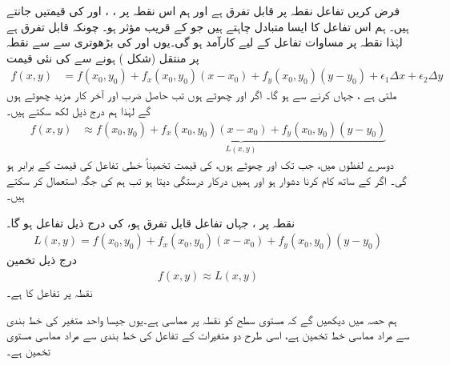 فرض کریں   تفاعل  نقطہ  پر  قابل تفرق ہے  اور ہم اس نقطہ پر     ،  ، اور  کی  قیمتیں  جانتے ہیں۔ ہم  اس تفاعل کا ایسا متبادل  چاہتے ہیں جو      کے قریب  مؤثر ہو۔ چونکہ  قابل تفرق ہے لہٰذا نقطہ  پر مساوات   تفاعل  کے لیے کارآمد ہو گی۔یوں  اور  کی بڑھوتری  سے    سے نقطہ   پر   منتقل  (شکل )    ہونے سے  کی نئی قیمت
\begin{align*}
f(x,y)&=f(x_0,y_0)+f_x(x_0,y_0)(x-x_0)+f_y(x_0,y_0)(y-y_0)+\epsilon_1\Delta x+\epsilon_2\Delta y
\end{align*}
ملتی ہے ، جہاں  کرنے سے  ہو گا۔ اگر  اور  چھوٹے ہوں تب حاصل ضرب   اور    آخر کار  مزید چھوٹے ہوں گے لہٰذا ہم درج ذیل لکھ سکتے ہیں۔
\begin{align*}
f(x,y)&\approx \underbrace{f(x_0,y_0)+f_x(x_0,y_0)(x-x_0)+f_y(x_0,y_0)(y-y_0)}_{L(x,y)}
\end{align*}
دوسرے لفظوں میں، جب تک  اور  چھوٹے ہوں،  کی قیمت تخمیناً خطی تفاعل  کی   قیمت کے برابر ہو گی۔ اگر  کے ساتھ کام کرنا دشوار ہو اور  ہمیں درکار درستگی دیتا ہو تب ہم  کی جگہ  استعمال کر سکتے ہیں۔

نقطہ پر  ،  جہاں تفاعل  قابل تفرق ہو،  کی  درج ذیل تفاعل  ہو گا۔
\begin{align}\label{مساوات_کثیرالمتغیر_خط_بند_تخمین}
L(x,y)=f(x_0,y_0)+f_x(x_0,y_0)(x-x_0)+f_y(x_0,y_0)(y-y_0)
\end{align}
درج ذیل  تخمین
\begin{align*}
f(x,y)\approx L(x,y)
\end{align*}
  نقطہ  پر تفاعل   کا   ہے۔ 

ہم  حصہ  میں دیکھیں گے کہ مستوی  سطح  کو  نقطہ  پر مماسی ہے۔یوں  جیسا واحد متغیر کی خط بندی سے مراد  مماسی خط تخمین ہے، اسی طرح  دو متغیرات کے تفاعل کی خط بندی  سے مراد  مماسی مستوی  تخمین  ہے۔

